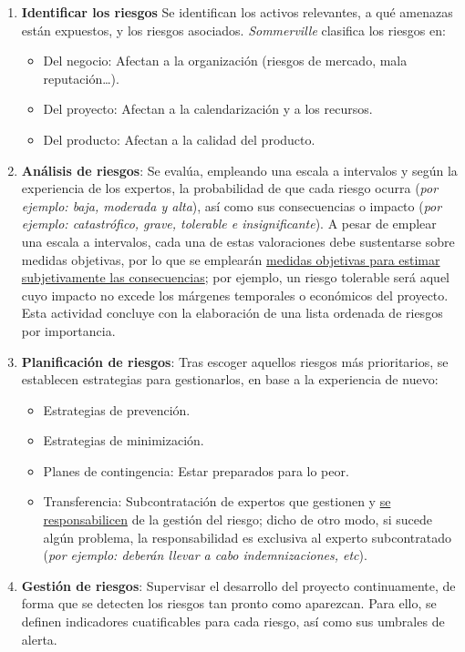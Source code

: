 \begin{enumerate}
   \item \textbf{Identificar los riesgos} Se identifican los activos relevantes, a qué amenazas están expuestos, y los riesgos asociados. \textit{Sommerville} clasifica los riesgos en:
      
      \begin{itemize}
         \item Del negocio: Afectan a la organización (riesgos de mercado, mala reputación\ldots).
         \item Del proyecto: Afectan a la calendarización y a los recursos.
         \item Del producto: Afectan a la calidad del producto.
      \end{itemize}

   \item \textbf{Análisis de riesgos}: Se evalúa, empleando una escala a intervalos y según la experiencia de los expertos, la probabilidad de que cada riesgo ocurra (\textit{por ejemplo: baja, moderada y alta}), así como sus consecuencias o impacto (\textit{por ejemplo: catastrófico, grave, tolerable e insignificante}). A pesar de emplear una escala a intervalos, cada una de estas valoraciones debe sustentarse sobre medidas objetivas, por lo que se emplearán \uline{medidas objetivas para estimar subjetivamente las consecuencias}; por ejemplo, un riesgo tolerable será aquel cuyo impacto no excede los márgenes temporales o económicos del proyecto. Esta actividad concluye con la elaboración de una lista ordenada de riesgos por importancia.

   \item \textbf{Planificación de riesgos}:
         Tras escoger aquellos riesgos más prioritarios, se establecen estrategias para gestionarlos, en base a la experiencia de nuevo:
         \begin{itemize}
            \item Estrategias de prevención.
            \item Estrategias de minimización.
            \item Planes de contingencia: Estar preparados para lo peor.
            \item Transferencia: Subcontratación de expertos que gestionen y \uline{se responsabilicen} de la gestión del riesgo; dicho de otro modo, si sucede algún problema, la responsabilidad es exclusiva al experto subcontratado (\textit{por ejemplo: deberán llevar a cabo indemnizaciones, etc}).
         \end{itemize}
   \item \textbf{Gestión de riesgos}: Supervisar el desarrollo del proyecto continuamente, de forma que se detecten los riesgos tan pronto como aparezcan. Para ello, se definen indicadores cuatificables para cada riesgo, así como sus umbrales de alerta.
\end{enumerate}

